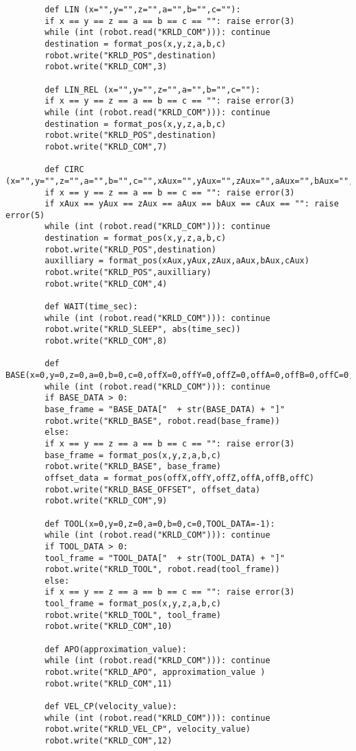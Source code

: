\documentclass{book}
\begin{document}
\begin{verbatim}
		def LIN (x="",y="",z="",a="",b="",c=""):
		if x == y == z == a == b == c == "": raise error(3)
		while (int (robot.read("KRLD_COM"))): continue
		destination = format_pos(x,y,z,a,b,c)
		robot.write("KRLD_POS",destination)
		robot.write("KRLD_COM",3)
		
		def LIN_REL (x="",y="",z="",a="",b="",c=""):
		if x == y == z == a == b == c == "": raise error(3)
		while (int (robot.read("KRLD_COM"))): continue
		destination = format_pos(x,y,z,a,b,c)
		robot.write("KRLD_POS",destination)
		robot.write("KRLD_COM",7)
		
		def CIRC (x="",y="",z="",a="",b="",c="",xAux="",yAux="",zAux="",aAux="",bAux="",cAux=""):
		if x == y == z == a == b == c == "": raise error(3)
		if xAux == yAux == zAux == aAux == bAux == cAux == "": raise error(5)
		while (int (robot.read("KRLD_COM"))): continue
		destination = format_pos(x,y,z,a,b,c)
		robot.write("KRLD_POS",destination)
		auxilliary = format_pos(xAux,yAux,zAux,aAux,bAux,cAux)
		robot.write("KRLD_POS",auxilliary)
		robot.write("KRLD_COM",4)
		
		def WAIT(time_sec):
		while (int (robot.read("KRLD_COM"))): continue
		robot.write("KRLD_SLEEP", abs(time_sec))
		robot.write("KRLD_COM",8)
		
		def BASE(x=0,y=0,z=0,a=0,b=0,c=0,offX=0,offY=0,offZ=0,offA=0,offB=0,offC=0,BASE_DATA=-1):
		while (int (robot.read("KRLD_COM"))): continue
		if BASE_DATA > 0: 
		base_frame = "BASE_DATA["  + str(BASE_DATA) + "]"
		robot.write("KRLD_BASE", robot.read(base_frame))	
		else:
		if x == y == z == a == b == c == "": raise error(3)
		base_frame = format_pos(x,y,z,a,b,c)
		robot.write("KRLD_BASE", base_frame)
		offset_data = format_pos(offX,offY,offZ,offA,offB,offC)
		robot.write("KRLD_BASE_OFFSET", offset_data)
		robot.write("KRLD_COM",9)
		
		def TOOL(x=0,y=0,z=0,a=0,b=0,c=0,TOOL_DATA=-1):
		while (int (robot.read("KRLD_COM"))): continue
		if TOOL_DATA > 0: 
		tool_frame = "TOOL_DATA["  + str(TOOL_DATA) + "]" 
		robot.write("KRLD_TOOL", robot.read(tool_frame))
		else:
		if x == y == z == a == b == c == "": raise error(3)
		tool_frame = format_pos(x,y,z,a,b,c)
		robot.write("KRLD_TOOL", tool_frame)
		robot.write("KRLD_COM",10)
		
		def APO(approximation_value):
		while (int (robot.read("KRLD_COM"))): continue
		robot.write("KRLD_APO", approximation_value )
		robot.write("KRLD_COM",11)
		
		def VEL_CP(velocity_value):
		while (int (robot.read("KRLD_COM"))): continue
		robot.write("KRLD_VEL_CP", velocity_value)
		robot.write("KRLD_COM",12)
		

\end{verbatim}
\end{document}
